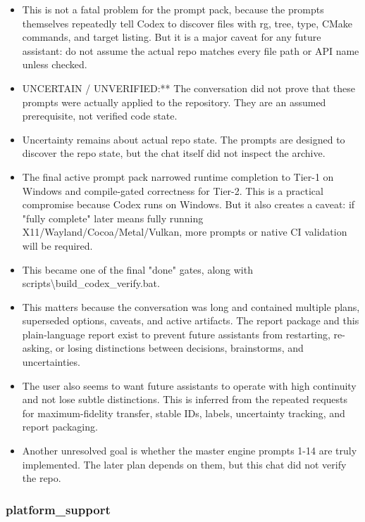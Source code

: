 \documentclass[11pt,a4paper]{report}
\begin{document}
\begin{itemize}
\item This is not a fatal problem for the prompt pack, because the prompts themselves repeatedly tell Codex to discover files with rg, tree, type, CMake commands, and target listing. But it is a major caveat for any future assistant: do not assume the actual repo matches every file path or API name unless checked.
\item UNCERTAIN / UNVERIFIED:** The conversation did not prove that these prompts were actually applied to the repository. They are an assumed prerequisite, not verified code state.
\item Uncertainty remains about actual repo state. The prompts are designed to discover the repo state, but the chat itself did not inspect the archive.
\item The final active prompt pack narrowed runtime completion to Tier-1 on Windows and compile-gated correctness for Tier-2. This is a practical compromise because Codex runs on Windows. But it also creates a caveat: if "fully complete" later means fully running X11/Wayland/Cocoa/Metal/Vulkan, more prompts or native CI validation will be required.
\item This became one of the final "done" gates, along with scripts\textbackslash{}build\_codex\_verify.bat.
\item This matters because the conversation was long and contained multiple plans, superseded options, caveats, and active artifacts. The report package and this plain-language report exist to prevent future assistants from restarting, re-asking, or losing distinctions between decisions, brainstorms, and uncertainties.
\item The user also seems to want future assistants to operate with high continuity and not lose subtle distinctions. This is inferred from the repeated requests for maximum-fidelity transfer, stable IDs, labels, uncertainty tracking, and report packaging.
\item Another unresolved goal is whether the master engine prompts 1-14 are truly implemented. The later plan depends on them, but this chat did not verify the repo.
\end{itemize}

\subsubsection{platform\_support}
\end{document}
